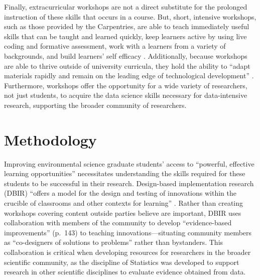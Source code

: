 \documentclass[12pt]{article}
\begin{document}
\quad Finally, extracurricular workshops are not a direct substitute for the
prolonged instruction of these skills that occurs in a course. But, short, 
intensive workshops, such as those provided by the Carpentries, are able to
teach immediately useful skills that can be taught and learned quickly, keep
learners active by using live coding and formative assessment, work with a
learners from a variety of backgrounds, and build learners' self efficacy 
\citep{null-carpentries}. Additionally, because workshops are able to thrive
outside of university curricula, they hold the ability to ``adapt materials
rapidly and remain on the leading edge of technological development'' 
\citep[p. 547]{hampton}. Furthermore, workshops offer the opportunity for a wide
variety of researchers, not just students, to acquire the data science skills
necessary for data-intensive research, supporting the broader community of
researchers. 

\section{Methodology}

\quad Improving environmental science graduate students' access to ``powerful,
effective learning opportunities'' \citep[p. 137]{penuel} necessitates
understanding the skills required for these students to be successful in their
research. Design-based implementation research (DBIR) \citep{confrey, penuel, 
oneill} ``offers a model for the design and testing of innovations within the
crucible of classrooms and other contexts for learning'' 
\citep[p.\ 140]{penuel}. Rather than creating workshops covering content outside
parties believe are important, DBIR uses collaboration with members of the
community to develop ``evidence-based improvements'' (p.\ 143) to teaching 
innovations---situating community members as ``co-designers of solutions to 
problems'' \citep[p. 140]{penuel} rather than bystanders. This collaboration 
is critical when developing resources for researchers in the broader scientific
community, as the discipline of Statistics was developed to support research in
other scientific disciplines to evaluate evidence obtained from data. 
\end{document}
